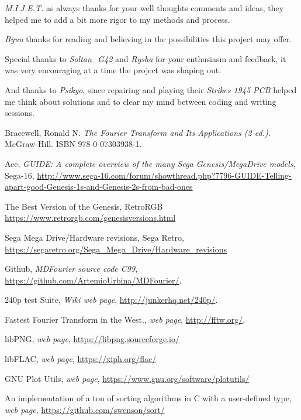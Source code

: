 \documentclass[10pt,a4paper]{report}
\begin{document}
\begin{appendices}
\textit{M.I.J.E.T.} as always thanks for your well thoughts comments and ideas, they helped me to add a bit more rigor to my methods and process.

\textit{Byuu} thanks for reading and believing in the possibilities this project may offer.

Special thanks to \textit{Soltan\_G42} and \textit{Rysha} for your enthusiasm and feedback, it was very encouraging at a time the project was shaping out.

And thanks to \textit{Psikyo}, since repairing and playing their \textit{Strikes 1945 PCB} helped me think about solutions and to clear my mind between coding and writing sessions.

\end{appendices}

\begin{thebibliography}{9}
	Bracewell, Ronald N. 
	\textit{The Fourier Transform and Its Applications (2 ed.).}
	McGraw-Hill. ISBN 978-0-07303938-1.
	
	Ace, \textit{GUIDE: A complete overview of the many Sega Genesis/MegaDrive models}, Sega-16,
	\url{http://www.sega-16.com/forum/showthread.php?7796-GUIDE-Telling-apart-good-Genesis-1s-and-Genesis-2s-from-bad-ones}
	
	The Best Version of the Genesis, RetroRGB
	\url{https://www.retrorgb.com/genesisversions.html}
	
	Sega Mega Drive/Hardware revisions, Sega Retro,
	\url{https://segaretro.org/Sega_Mega_Drive/Hardware_revisions}
	
	Github,
	\textit{MDFourier source code C99},
	\url{https://github.com/ArtemioUrbina/MDFourier/}.
	
	240p test Suite,
	\textit{Wiki web page},
	\url{http://junkerhq.net/240p/}.
	
	Fastest Fourier Transform in the West.,
	\textit{web page},
	\url{http://fftw.org/}.
	
	libPNG,
	\textit{web page},
	\url{https://libpng.sourceforge.io/}
	
	libFLAC,
	\textit{web page},
	\url{https://xiph.org/flac/}
	
	GNU Plot Utils,
	\textit{web page},
	\url{https://www.gnu.org/software/plotutils/}
	
	An implementation of a ton of sorting algorithms in C with a user-defined type,
	\textit{web page},
	\url{https://github.com/swenson/sort/}
	

\end{thebibliography}
\end{document}
